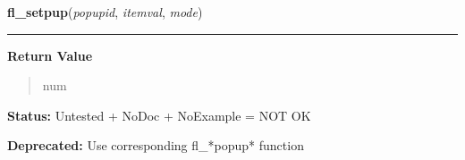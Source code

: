    \label{xformslib:deprecated:fl_setpup_mode}

    \vspace{0.5ex}

\hspace{.8\funcindent}\begin{boxedminipage}{\funcwidth}

    \raggedright \textbf{fl\_setpup}(\textit{popupid}, \textit{itemval}, \textit{mode})

    \vspace{-1.5ex}

    \rule{\textwidth}{0.5\fboxrule}
\setlength{\parskip}{2ex}
\setlength{\parskip}{1ex}
      \textbf{Return Value}
    \vspace{-1ex}

      \begin{quote}
      num

      \end{quote}

\textbf{Status:} Untested + NoDoc + NoExample = NOT OK



\textbf{Deprecated:} Use corresponding fl\_*popup* function



    \end{boxedminipage}

    \label{xformslib:deprecated:fl_set_xyplot_fontsize}

    \vspace{0.5ex}

